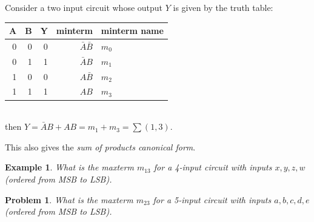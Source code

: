 \documentclass{article}
\newtheorem{example}{Example}
\newtheorem{prob}{Problem}
\begin{document}
\noindent Consider a two input circuit whose output $Y$ is given by the truth table:\\
\begin{tabular}{rrrrp{20mm}}
  \toprule
  A & B &  Y & minterm & minterm name\\
  \midrule
  0 & 0 & 0 & $\bar{A} \bar{B}$ & $m_0$ \\
  0 & 1 & 1 & $\bar{A}      B $ & $m_1$ \\
  1 & 0 & 0 & $     A  \bar{B}$ & $m_2$ \\
  1 & 1 & 1 & $     A       B $ & $m_3$ \\
  \bottomrule
\end{tabular}\\[1em]
then $Y = \bar{A}      B  + A B = m_1 + m_3 = \sum (1, 3)$.

\noindent This also gives the \emph{sum of products canonical form}.

\begin{example}
  What is the maxterm $m_{13}$ for a 4-input circuit with inputs $x, y, z, w$
  (ordered from MSB to LSB).
\end{example}
\vspace{10em}


\begin{prob}
  What is the maxterm $m_{23}$ for a 5-input circuit with inputs $a, b, c, d, e$
  (ordered from MSB to LSB).
\end{prob}
\vspace{10em}
\end{document}
